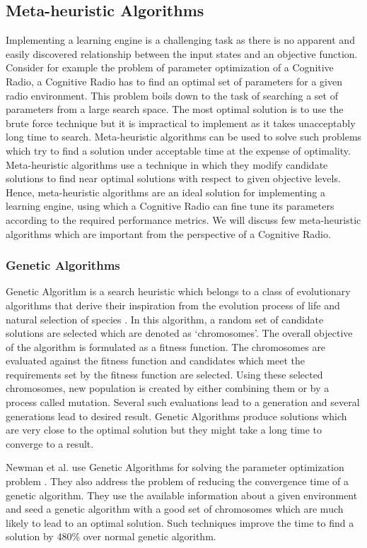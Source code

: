 \documentclass[conference]{IEEEtran}
\begin{document}
\subsection{Meta-heuristic Algorithms}
	 Implementing a learning engine is a challenging task as there is no apparent and easily discovered relationship between the input states and an objective function. Consider for example the problem of parameter optimization of a Cognitive Radio, a Cognitive Radio has to find an optimal set of parameters for a given radio environment. This problem boils down to the task of searching a set of parameters from a large search space. The most optimal solution is to use the brute force technique but it is impractical to implement as it takes unacceptably long time to search. Meta-heuristic algorithms can be used to solve such problems which try to find a solution under acceptable time at the expense of optimality. Meta-heuristic algorithms use a technique in which they modify candidate solutions to find near optimal solutions with respect to given objective levels. Hence, meta-heuristic algorithms are an ideal solution for implementing a learning engine, using which a Cognitive Radio can fine tune its parameters according to the required performance metrics. We will discuss few meta-heuristic algorithms which are important from the perspective of a Cognitive Radio. 

\subsubsection{Genetic Algorithms}
	Genetic Algorithm is a search heuristic which belongs to a class of evolutionary algorithms that derive their inspiration from the evolution process of life and natural selection of species \cite{6}. In this algorithm, a random set of candidate solutions are selected which are denoted as `chromosomes'. The overall objective of the algorithm is formulated as a fitness function. The chromosomes are evaluated against the fitness function and candidates which meet the requirements set by the fitness function are selected. Using these selected chromosomes, new population is created by either combining them or by a process called mutation. Several such evaluations lead to a generation and several generations lead to desired result. Genetic Algorithms produce solutions which are very close to the optimal solution but they might take a long time to converge to a result.

    Newman et al. use Genetic Algorithms for solving the parameter optimization problem \cite{9}. They also address the problem of reducing the convergence time of a genetic algorithm. They use the available information about a given environment and seed a genetic algorithm with a good set of chromosomes which are much likely to lead to an optimal solution. Such techniques improve the time to find a solution by 480\% over normal genetic algorithm.
    
\end{document}
